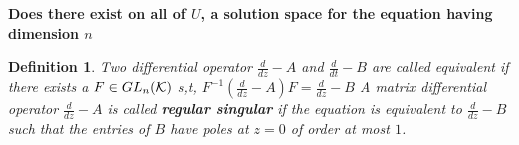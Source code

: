 \documentclass[11pt]{article}
\newtheorem{dfn}[thm]{Definition}
\newcommand{\calk}{{\cal K}}
\begin{document}
\textbf{Does there exist on all of $U$, a solution space for the equation having dimension $n$}

\begin{dfn}
Two differential operator $\frac{d}{dz}-A$ and $\frac{d}{dt}-B$ are called equivalent if there exists a $F\in GL_n(\calk)$ s,t, $F^{-1}(\frac{d}{dz}-A)F=\frac{d}{dz}-B$
A matrix differential operator $\frac{d}{dz}-A$ is called \textbf{regular singular} if the equation is equivalent to $\frac{d}{dz}-B$ such that the entries of $B$ have poles at $z=0$ of order at most $1$.
\end{dfn}
\end{document}
